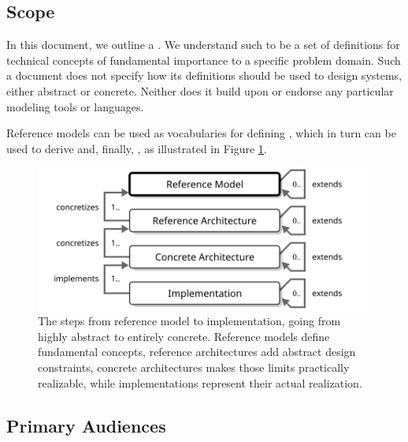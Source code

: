 \subsection{Scope}
\label{sec:introduction:scope}

In this document, we outline a .
We understand such to be a set of definitions for technical concepts of fundamental importance to a specific problem domain.
Such a document does not specify how its definitions should be used to design systems, either abstract or concrete.
Neither does it build upon or endorse any particular modeling tools or languages.

Reference models can be used as vocabularies for defining , which in turn can be used to derive  and, finally, , as illustrated in Figure \ref{fig:reference-model}.

\vspace*{\fill}

\begin{figure}[ht]
  \centering
  \includegraphics{figures/reference-model}
  \caption{
    The steps from reference model to implementation, going from highly abstract to entirely concrete.
    Reference models define fundamental concepts, reference architectures add abstract design constraints, concrete architectures makes those limits practically realizable, while implementations represent their actual realization.
  }
  \label{fig:reference-model}
\end{figure}

\vspace*{\fill}

\newpage

\subsection{Primary Audiences}
\label{sec:introduction:audiences}

